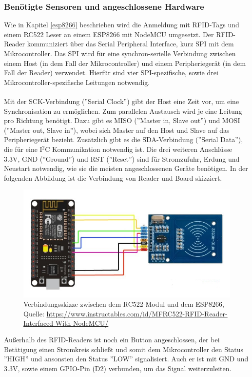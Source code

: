 \documentclass[12pt,titlepage]{scrartcl}
\begin{document}
			\subsubsection{Benötigte Sensoren und angeschlossene Hardware}
			Wie in Kapitel \ref{esp8266} beschrieben wird die Anmeldung mit RFID-Tags und einem RC522 Leser an einem ESP8266 mit NodeMCU umgesetzt. Der RFID-Reader kommuniziert über das Serial Peripheral Interface, kurz SPI \cite{spistandard} mit dem Mikrocontroller. Das SPI wird für eine synchron-serielle Verbindung zwischen einem Host (in dem Fall der Mikrocontroller) und einem Peripheriegerät (in dem Fall der Reader) verwendet. Hierfür sind vier SPI-spezifische, sowie drei Mikrocontroller-spezifische Leitungen notwendig. \\ \\
			Mit der SCK-Verbindung (''Serial Clock'') gibt der Host eine Zeit vor, um eine Synchronisation zu ermöglichen. Zum parallelen Austausch wird je eine Leitung pro Richtung benötigt. Dazu gibt es MISO (''Master in, Slave out'') und MOSI (''Master out, Slave in''), wobei sich Master auf den Host und Slave auf das Peripheriegerät bezieht. Zusätzlich gibt es die SDA-Verbindung (''Serial Data''), die für eine I$^2$C Kommunikation notwendig ist. Die drei weiteren Anschlüsse 3.3V, GND (''Ground'') und RST (''Reset'') sind für Stromzufuhr, Erdung und Neustart notwendig, wie sie die meisten angeschlossenen Geräte benötigen. In der folgenden Abbildung ist die Verbindung von Reader und Board skizziert.
		\begin{figure}[H] 
  			\centering
    		\includegraphics[height=0.3\textheight]{VerbindungRC522}
  			\caption{Verbindungsskizze zwischen dem RC522-Modul und dem ESP8266, Quelle: \url{https://www.instructables.com/id/MFRC522-RFID-Reader-Interfaced-With-NodeMCU/}}
  			\label{fig:VerbindungRC522}
		\end{figure}
			\noindent Außerhalb des RFID-Readers ist noch ein Button angeschlossen, der bei Betätigung einen Stromkreis schließt und somit dem Mikrocontroller den Status ''HIGH'' und ansonsten den Status ''LOW'' signalisiert. Auch er ist mit GND und 3.3V, sowie einem GPIO-Pin (D2) verbunden, um das Signal weiterzuleiten.
\end{document}
